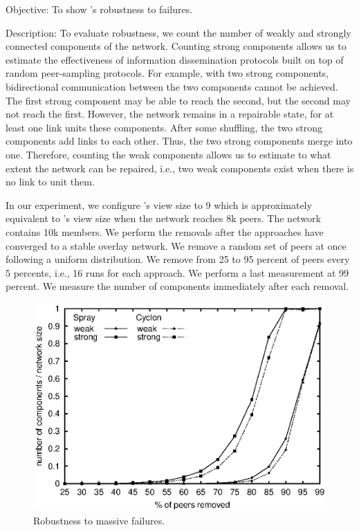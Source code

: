 \begin{asparadesc}
\item[Objective:] To show \SPRAY's robustness to failures.
\item[Description:] To evaluate robustness, we count the number of weakly and
  strongly connected components of the network. Counting strong components
  allows us to estimate the effectiveness of information dissemination protocols
  built on top of random peer-sampling protocols. For example, with two strong
  components, bidirectional communication between the two components cannot be
  achieved. The first strong component may be able to reach the second, but the
  second may not reach the first. However, the network remains in a repairable
  state, for at least one link units these components. After some shuffling, the
  two strong components add links to each other. Thus, the two strong components
  merge into one. Therefore, counting the weak components allows us to estimate
  to what extent the network can be repaired, i.e., two weak components exist
  when there is no link to unit them.

  In our experiment, we configure \CYCLON's view size to 9 which is
  approximately equivalent to \SPRAY's view size when the network reaches 8k
  peers. The network contains 10k members. We perform the removals after the
  approaches have converged to a stable overlay network. We remove a random set
  of peers at once following a uniform distribution. We remove from 25 to 95
  percent of peers every 5 percents, i.e., 16 runs for each approach. We perform
  a last measurement at 99 percent. We measure the number of components
  immediately after each removal.

\begin{figure}
  \centering
  \includegraphics[width=\SCALE\textwidth]{img/resilience.eps}
  \caption{\label{fig:resilience}Robustness to massive failures.}
\end{figure}


\end{asparadesc}
